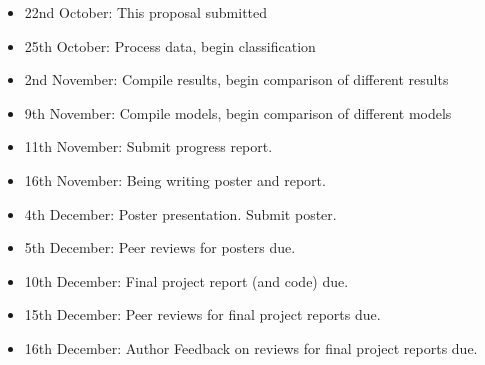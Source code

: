 \documentclass{article}
\begin{document}
\begin{itemize}
\item 22nd October: This proposal submitted
\item 25th October: Process data, begin classification
\item 2nd November: Compile results, begin comparison of different results
\item 9th November: Compile models, begin comparison of different models
\item 11th November: Submit progress report.
\item 16th November: Being writing poster and report.
\item 4th December: Poster presentation. Submit poster.
\item 5th December: Peer reviews for posters due.
\item 10th December: Final project report (and code) due.
\item 15th December: Peer reviews for final project reports due.
\item 16th December: Author Feedback on reviews for final project reports due.
\end{itemize}
\end{document}
